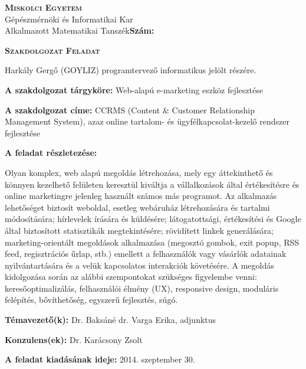 \begin{flushleft}
\textsc{\bfseries Miskolci Egyetem}\\
Gépészmérnöki és Informatikai Kar\\
Alkalmazott Matematikai Tanszék\hspace*{4cm}\hfil \textbf{Szám:}
\end{flushleft}
\vskip 0.5cm
\begin{center}
\large\textsc{\bfseries Szakdolgozat Feladat}
\end{center}
\vskip 0.5cm
Harkály Gergő (GOYLIZ) programtervező informatikus jelölt részére.\newline

\noindent\textbf{A szakdolgozat tárgyköre:} Web-alapú e-marketing eszköz fejlesztése\newline

\noindent\textbf{A szakdolgozat címe:} CCRMS (Content \& Customer Relationship Management System), azaz online tartalom- és ügyfélkapcsolat-kezelő rendszer fejlesztése\newline

\noindent\textbf{A feladat részletezése:}

\noindent Olyan komplex, web alapú megoldás létrehozása, mely egy áttekinthető és könnyen kezelhető felületen keresztül kiváltja a vállalkozások által értékesítésre és online marketingre jelenleg használt számos más programot. Az alkalmazás lehetőséget biztosít weboldal, esetleg webáruház létrehozására és tartalmi módosítására; hírlevelek írására és küldésére; látogatottsági, értékesítési és Google által biztosított statisztikák megtekintésére; rövidített linkek generálására; marketing-orientált megoldások alkalmazása (megosztó gombok, exit popup, RSS feed, regisztrációs űrlap, stb.) emellett a felhasználók vagy vásárlók adatainak nyilvántartására és a velük kapcsolatos interakciók követésére. A megoldás kidolgozása során az alábbi szempontokat szükséges figyelembe venni: keresőoptimalizálás, felhasználói élmény (UX), responsive design, moduláris felépítés, bővíthetőség, egyszerű fejlesztés, súgó.

\vfill

\noindent\textbf{Témavezető(k):} Dr. Baksáné dr. Varga Erika, adjunktus\newline

\noindent\textbf{Konzulens(ek):} Dr. Karácsony Zsolt\newline

\noindent\textbf{A feladat kiadásának ideje:} 2014. szeptember 30. \newline

